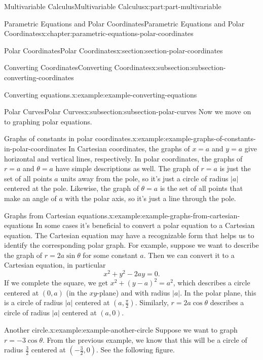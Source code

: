 \documentclass[twoside,10pt,]{book}
\numberwithin{equation}{part}
\begin{document}
\begin{partptx}{Multivariable Calculus}{}{Multivariable Calculus}{}{}{x:part:part-multivariable}
\begin{chapterptx}{Parametric Equations and Polar Coordinates}{}{Parametric Equations and Polar Coordinates}{}{}{x:chapter:parametric-equations-polar-coordinates}
\begin{sectionptx}{Polar Coordinates}{}{Polar Coordinates}{}{}{x:section:section-polar-coordinates}
\begin{subsectionptx}{Converting Coordinates}{}{Converting Coordinates}{}{}{x:subsection:subsection-converting-coordinates}
\begin{example}{Converting equations.}{x:example:example-converting-equations}
\begin{equation*}
\end{equation*}
\end{example}
\end{subsectionptx}
%
%
\typeout{************************************************}
\typeout{************************************************}
%
\begin{subsectionptx}{Polar Curves}{}{Polar Curves}{}{}{x:subsection:subsection-polar-curves}
Now we move on to graphing polar equations.%
\begin{example}{Graphs of constants in polar coordinates.}{x:example:example-graphs-of-constants-in-polar-coordinates}%
In Cartesian coordinates, the graphs of \(x=a\) and \(y=a\) give horizontal and vertical lines, respectively. In polar coordinates, the graphs of \(r=a\) and \(\theta=a\) have simple descriptions as well. The graph of \(r=a\) is just the set of all points \(a\) units away from the pole, so it's just a circle of radius \(|a|\) centered at the pole. Likewise, the graph of \(\theta = a\) is the set of all points that make an angle of \(a\) with the polar axis, so it's just a line through the pole.%
\end{example}
\begin{example}{Graphs from Cartesian equations.}{x:example:example-graphs-from-cartesian-equations}%
In some cases it's beneficial to convert a polar equation to a Cartesian equation. The Cartesian equation may have a recognizable form that helps us to identify the corresponding polar graph. For example, suppose we want to describe the graph of \(r = 2a\sin\theta\) for some constant \(a\). Then we can convert it to a Cartesian equation, in particular%
%
\begin{equation*}
x^{2}+y^{2} - 2ay = 0.
\end{equation*}
If we complete the square, we get \(x^{2}+(y-a)^{2} = a^{2}\), which describes a circle centered at \((0,a)\) (in the \(xy\)-plane) and with radius \(|a|\). In the polar plane, this is a circle of radius \(|a|\) centered at \((a,\frac{\pi}{2}).\) Similarly, \(r=2a\cos\theta\) describes a circle of radius \(|a|\) centered at \((a,0)\).%
\end{example}
\begin{example}{Another circle.}{x:example:example-another-circle}%
Suppose we want to graph \(r=-3\cos\theta\). From the previous example, we know that this will be a circle of radius \(\frac{3}{2}\) centered at \((-\frac{3}{2},0)\). See the following figure.%
\end{example}

\end{subsectionptx}
\end{sectionptx}
\end{chapterptx}
\end{partptx}
\end{document}
